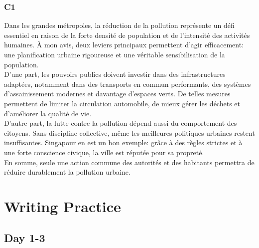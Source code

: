 \documentclass{book}
\begin{document}
        \subsection*{C1}
            Dans les grandes métropoles, la réduction de la pollution représente un défi essentiel en raison de la forte densité de population et de l'intensité des activités humaines.
            À mon avis, deux leviers principaux permettent d'agir efficacement: une planification urbaine rigoureuse et une véritable sensibilisation de la population.
            \\
            D'une part, les pouvoirs publics doivent investir dans des infrastructures adaptées, notamment dans des transports en commun performants, des systèmes d'assainissement modernes et davantage d'espaces verts.
            De telles mesures permettent de limiter la circulation automobile, de mieux gérer les déchets et d'améliorer la qualité de vie.
            \\
            D'autre part, la lutte contre la pollution dépend aussi du comportement des citoyens. 
            Sans discipline collective, même les meilleures politiques urbaines restent insuffisantes.
            Singapour en est un bon exemple: grâce à des règles strictes et à une forte conscience civique, la ville est réputée pour sa propreté.
            \\
            En somme, seule une action commune des autorités et des habitants permettra de réduire durablement la pollution urbaine.

\chapter{Writing Practice}

    \section{Day 1-3}
\end{document}
